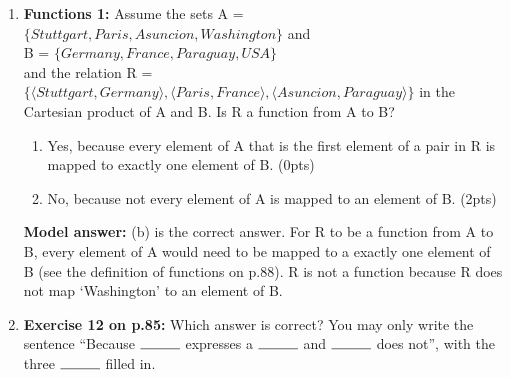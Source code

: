 \documentclass[a4,11pt]{article}
\begin{document}
\begin{enumerate}[leftmargin = 12pt]
Expression:

\begin{enumerate}[noitemsep]
        \item domain of R
        \item codomain of R
        \item range of R
\end{enumerate}

Sets:

\begin{enumerate}[noitemsep]
        \item $\{ Stuttgart, Paris, Asuncion, Washington \}$
        \item B
        \item $\{ Germany, France, Paraguay \}$
\end{enumerate}   

{\bf Model answer:} The domain of R is the set A = $\{ Stuttgart, Paris, Asuncion, Washington \}$. The codomain of R is the set B. The range of R are those elements of B that are the second member of a pair in R, so the set $\{ Germany, France, Paraguay \}$


\item {\bf Functions 1:} Assume the sets A = $\{ Stuttgart, Paris, Asuncion, Washington \}$  and  \\ B = $\{ Germany, France, Paraguay, USA \}$ \\ and the relation R = $\{\langle Stuttgart, Germany \rangle, \langle Paris, France \rangle, \langle Asuncion, Paraguay \rangle\}$ in the Cartesian product of A and B. Is R a function from A to B?

\begin{enumerate}[noitemsep]
        \item Yes, because every element of A that is the first element of a pair in R is mapped to exactly one element of B. (0pts)
	\item No, because not every element of A is mapped to an element of B. (2pts)
\end{enumerate}

{\bf Model answer:} (b) is the correct answer. For R to be a function from A to B, every element of A would need to be mapped to a exactly one element of B (see the definition of functions on p.88). R is not a function because  R does not map `Washington'  to an element of B. 

\item {\bf Exercise 12 on p.85:} Which answer is correct? You may only write the sentence ``Because $\rule{1cm}{0.15mm}$ expresses a $\rule{1cm}{0.15mm}$ and $\rule{1cm}{0.15mm}$ does not'', with the three $\rule{1cm}{0.15mm}$ filled in.


\end{enumerate}
\end{document}
